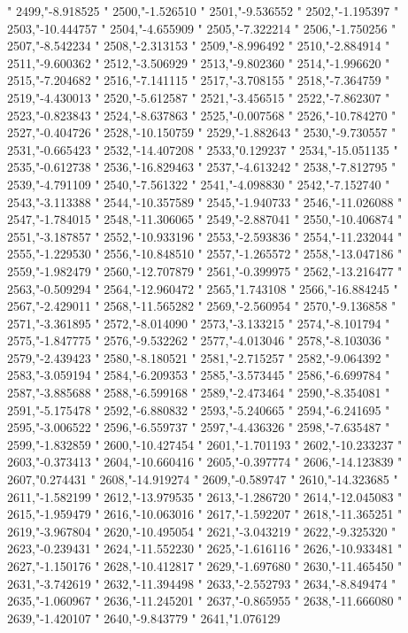 "
2499,"-8.918525
"
2500,"-1.526510
"
2501,"-9.536552
"
2502,"-1.195397
"
2503,"-10.444757
"
2504,"-4.655909
"
2505,"-7.322214
"
2506,"-1.750256
"
2507,"-8.542234
"
2508,"-2.313153
"
2509,"-8.996492
"
2510,"-2.884914
"
2511,"-9.600362
"
2512,"-3.506929
"
2513,"-9.802360
"
2514,"-1.996620
"
2515,"-7.204682
"
2516,"-7.141115
"
2517,"-3.708155
"
2518,"-7.364759
"
2519,"-4.430013
"
2520,"-5.612587
"
2521,"-3.456515
"
2522,"-7.862307
"
2523,"-0.823843
"
2524,"-8.637863
"
2525,"-0.007568
"
2526,"-10.784270
"
2527,"-0.404726
"
2528,"-10.150759
"
2529,"-1.882643
"
2530,"-9.730557
"
2531,"-0.665423
"
2532,"-14.407208
"
2533,"0.129237
"
2534,"-15.051135
"
2535,"-0.612738
"
2536,"-16.829463
"
2537,"-4.613242
"
2538,"-7.812795
"
2539,"-4.791109
"
2540,"-7.561322
"
2541,"-4.098830
"
2542,"-7.152740
"
2543,"-3.113388
"
2544,"-10.357589
"
2545,"-1.940733
"
2546,"-11.026088
"
2547,"-1.784015
"
2548,"-11.306065
"
2549,"-2.887041
"
2550,"-10.406874
"
2551,"-3.187857
"
2552,"-10.933196
"
2553,"-2.593836
"
2554,"-11.232044
"
2555,"-1.229530
"
2556,"-10.848510
"
2557,"-1.265572
"
2558,"-13.047186
"
2559,"-1.982479
"
2560,"-12.707879
"
2561,"-0.399975
"
2562,"-13.216477
"
2563,"-0.509294
"
2564,"-12.960472
"
2565,"1.743108
"
2566,"-16.884245
"
2567,"-2.429011
"
2568,"-11.565282
"
2569,"-2.560954
"
2570,"-9.136858
"
2571,"-3.361895
"
2572,"-8.014090
"
2573,"-3.133215
"
2574,"-8.101794
"
2575,"-1.847775
"
2576,"-9.532262
"
2577,"-4.013046
"
2578,"-8.103036
"
2579,"-2.439423
"
2580,"-8.180521
"
2581,"-2.715257
"
2582,"-9.064392
"
2583,"-3.059194
"
2584,"-6.209353
"
2585,"-3.573445
"
2586,"-6.699784
"
2587,"-3.885688
"
2588,"-6.599168
"
2589,"-2.473464
"
2590,"-8.354081
"
2591,"-5.175478
"
2592,"-6.880832
"
2593,"-5.240665
"
2594,"-6.241695
"
2595,"-3.006522
"
2596,"-6.559737
"
2597,"-4.436326
"
2598,"-7.635487
"
2599,"-1.832859
"
2600,"-10.427454
"
2601,"-1.701193
"
2602,"-10.233237
"
2603,"-0.373413
"
2604,"-10.660416
"
2605,"-0.397774
"
2606,"-14.123839
"
2607,"0.274431
"
2608,"-14.919274
"
2609,"-0.589747
"
2610,"-14.323685
"
2611,"-1.582199
"
2612,"-13.979535
"
2613,"-1.286720
"
2614,"-12.045083
"
2615,"-1.959479
"
2616,"-10.063016
"
2617,"-1.592207
"
2618,"-11.365251
"
2619,"-3.967804
"
2620,"-10.495054
"
2621,"-3.043219
"
2622,"-9.325320
"
2623,"-0.239431
"
2624,"-11.552230
"
2625,"-1.616116
"
2626,"-10.933481
"
2627,"-1.150176
"
2628,"-10.412817
"
2629,"-1.697680
"
2630,"-11.465450
"
2631,"-3.742619
"
2632,"-11.394498
"
2633,"-2.552793
"
2634,"-8.849474
"
2635,"-1.060967
"
2636,"-11.245201
"
2637,"-0.865955
"
2638,"-11.666080
"
2639,"-1.420107
"
2640,"-9.843779
"
2641,"1.076129
